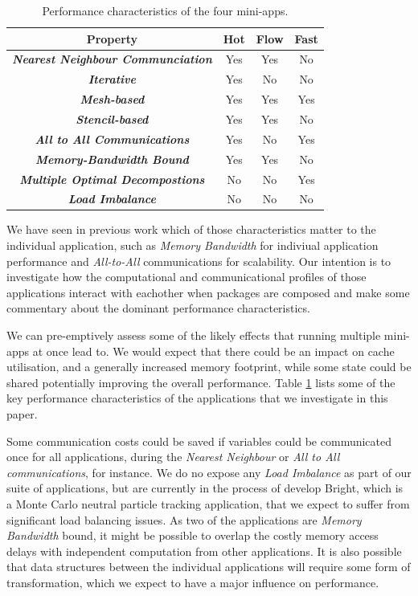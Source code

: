 \documentclass[runningheads,a4paper]{llncs}
\begin{document}
\begin{table}[h]
  \begin{center}
    \begin{tabular}{cccc}
      \hline
      \textbf{Property} & \textbf{Hot} & \textbf{Flow} & \textbf{Fast} \\
      \hline
      \textit{\textbf{Nearest Neighbour Communciation}} & Yes & Yes & No  \\
      \textit{\textbf{Iterative}} & Yes & No & No \\
      \textit{\textbf{Mesh-based}} & Yes & Yes & Yes \\
      \textit{\textbf{Stencil-based}} & Yes & Yes & No \\
      \textit{\textbf{All to All Communications}} & Yes & No & Yes \\
      \textit{\textbf{Memory-Bandwidth Bound}} & Yes & Yes & No \\
      \textit{\textbf{Multiple Optimal Decompostions}} & No & No & Yes \\
      \textit{\textbf{Load Imbalance}} & No & No & No \\
    \end{tabular}
  \end{center}
  \caption{Performance characteristics of the four mini-apps.}
  \label{tab:perf-char-mini-apps}
\end{table}

We have seen in previous work which of those characteristics matter to the individual application, such as \textit{Memory Bandwidth} for indiviual application performance and \textit{All-to-All} communications for scalability. Our intention is to investigate how the computational and communicational profiles of those applications interact with eachother when packages are composed and make some commentary about the dominant performance characteristics.

We can pre-emptively assess some of the likely effects that running multiple mini-apps at once lead to. We would expect that there could be an impact on cache utilisation, and a generally increased memory footprint, while some state could be shared potentially improving the overall performance. Table \ref{tab:perf-char-mini-apps} lists some of the key performance characteristics of the applications that we investigate in this paper. 

Some communication costs could be saved if variables could be communicated once for all applications, during the \textit{Nearest Neighbour} or \textit{All to All communications}, for instance. We do no expose any \textit{Load Imbalance} as part of our suite of applications, but are currently in the process of develop Bright, which is a Monte Carlo neutral particle tracking application, that we expect to suffer from significant load balancing issues. As two of the applications are \textit{Memory Bandwidth} bound, it might be possible to overlap the costly memory access delays with independent computation from other applications. It is also possible that data structures between the individual applications will require some form of transformation, which we expect to have a major influence on performance. 
\end{document}
